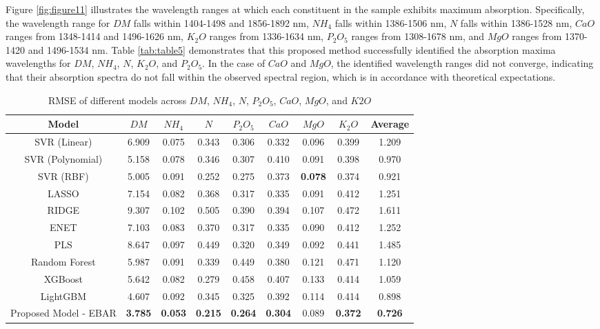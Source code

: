 \documentclass[10pt, a4paper, oneside]{article}
\begin{document}
Figure \ref{fig:figure11} illustrates the wavelength ranges at which each constituent in the sample exhibits maximum absorption. Specifically, the wavelength range for \(DM\) falls within 1404-1498 and 1856-1892 nm, \(NH_4\) falls within 1386-1506 nm, \(N\) falls within 1386-1528 nm, \(CaO\) ranges from 1348-1414 and 1496-1626 nm, \(K_2O\) ranges from 1336-1634 nm, \(P_2O_5\) ranges from 1308-1678 nm, and \(MgO\) ranges from 1370-1420 and 1496-1534 nm. Table \ref{tab:table5} demonstrates that this proposed method successfully identified the absorption maxima wavelengths for \(DM\), \(NH_4\), \(N\), \(K_2O\), and \(P_2O_5\). In the case of \(CaO\) and \(MgO\), the identified wavelength ranges did not converge, indicating that their absorption spectra do not fall within the observed spectral region, which is in accordance with theoretical expectations.
\renewcommand{\arraystretch}{1.5}
\setlength{\tabcolsep}{4pt}
\begin{table}[!ht]
    \small
    \centering
    \begin{tabular}{|c|c|c|c|c|c|c|c|c|}
        \hline
        \textbf{Model} & \textbf{\(DM\)} & \textbf{\(NH_4\)} & \textbf{\(N\)} & \textbf{\(P_2O_5\)} & \textbf{\(CaO\)} & \textbf{\(MgO\)} & \textbf{\(K_2O\)} & \textbf{Average} \\
        \hline
        SVR (Linear) & 6.909 & 0.075 & 0.343 & 0.306 & 0.332 & 0.096 & 0.399 & 1.209 \\ \hline
        SVR (Polynomial) & 5.158 & 0.078 & 0.346 & 0.307 & 0.410 & 0.091 & 0.398 & 0.970 \\ \hline
        SVR (RBF) & 5.005 & 0.091 & 0.252 & 0.275 & 0.373 & \textbf{0.078} & 0.374 & 0.921 \\ \hline
        LASSO & 7.154 & 0.082 & 0.368 & 0.317 & 0.335 & 0.091 & 0.412 & 1.251 \\ \hline
        RIDGE & 9.307 & 0.102 & 0.505 & 0.390 & 0.394 & 0.107 & 0.472 & 1.611 \\ \hline
        ENET & 7.103 & 0.083 & 0.370 & 0.317 & 0.335 & 0.090 & 0.412 & 1.252 \\ \hline
        PLS & 8.647 & 0.097 & 0.449 & 0.320 & 0.349 & 0.092 & 0.441 & 1.485 \\ \hline
        Random Forest & 5.987 & 0.091 & 0.339 & 0.449 & 0.380 & 0.121 & 0.471 & 1.120 \\ \hline
        XGBoost & 5.642 & 0.082 & 0.279 & 0.458 & 0.407 & 0.133 & 0.414 & 1.059 \\ \hline
        LightGBM & 4.607 & 0.092 & 0.345 & 0.325 & 0.392 & 0.114 & 0.414 & 0.898 \\ \hline
        Proposed Model - EBAR & \textbf{3.785} & \textbf{0.053} & \textbf{0.215} & \textbf{0.264} & \textbf{0.304} & 0.089 & \textbf{0.372} & \textbf{0.726} \\
        \hline
    \end{tabular}
    \caption{RMSE of different models across \(DM\), \(NH_4\), \(N\), \(P_2O_5\), \(CaO\), \(MgO\), and \(K2O\)}
    \label{tab:table3}
\end{table}
\end{document}
